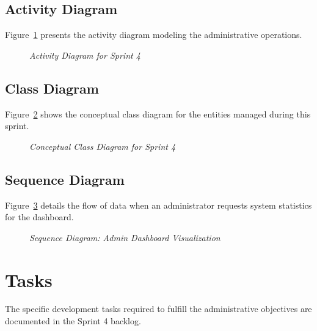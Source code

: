 \subsection{Activity Diagram}
Figure~\ref{fig:sprint4_activity} presents the activity diagram modeling the administrative operations.

\begin{figure}[H]
	\centering
	\caption{\textit{Activity Diagram for Sprint 4}}
	\label{fig:sprint4_activity}
\end{figure}

\subsection{Class Diagram}
Figure~\ref{fig:sprint4_class} shows the conceptual class diagram for the entities managed during this sprint.

\begin{figure}[H]
	\centering
	\caption{\textit{Conceptual Class Diagram for Sprint 4}}
	\label{fig:sprint4_class}
\end{figure}

\subsection{Sequence Diagram}
Figure~\ref{fig:sprint4_seq_admin} details the flow of data when an administrator requests system statistics for the dashboard.

\begin{figure}[H]
	\centering
	\caption{\textit{Sequence Diagram: Admin Dashboard Visualization}}
	\label{fig:sprint4_seq_admin}
\end{figure}

\section{Tasks}
The specific development tasks required to fulfill the administrative objectives are documented in the Sprint 4 backlog.

